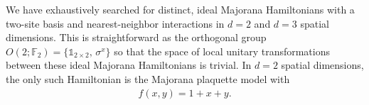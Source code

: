 \documentclass[aps,twocolumn,preprintnumbers,floatfix,showpacs,prx]{revtex4-1}
\begin{document}

We have exhaustively searched for distinct,
ideal Majorana Hamiltonians with a two-site basis and nearest-neighbor interactions in $d = 2$ and $d = 3$ spatial dimensions.
This is straightforward as the orthogonal group $O(2; \mathbb{F}_{2}) = \{\mathds{1}_{2\times 2}, \,\sigma^{x}\} $
so that the space of local unitary transformations between these ideal Majorana Hamiltonians is trivial.
In $d = 2$ spatial dimensions, the only such Hamiltonian is the Majorana plaquette model with
\begin{align}
f(x,y) = 1 + x + y.
\end{align}
\end{document}
